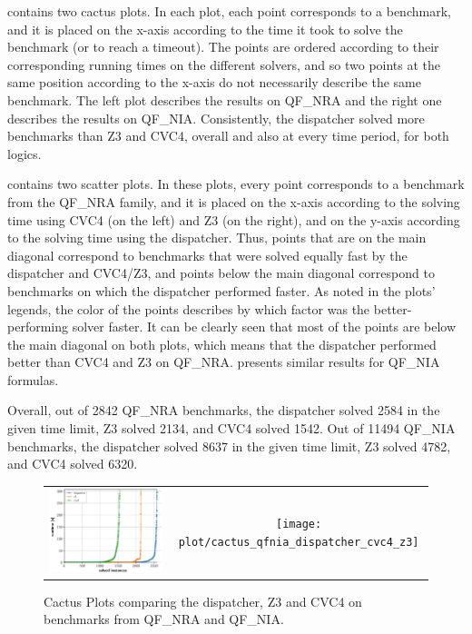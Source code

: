 \documentclass{article}
\begin{document}
 contains two cactus plots.
In each plot, each point corresponds to a benchmark, and it
is placed on the x-axis according to the time
it took to solve the benchmark (or to reach a timeout).
The points are ordered according to their corresponding
running times on the different solvers, and so
two points at the same position according to the x-axis
do not necessarily describe the same benchmark.
The left plot describes the results on QF\_NRA and
the right one describes the results on QF\_NIA.
Consistently, the dispatcher solved more benchmarks
than Z3 and CVC4, overall and also at every time period,
for both logics.

 contains two scatter plots.
In these plots, every point corresponds to a benchmark
from the QF\_NRA family,
and it is placed on the x-axis according to the
solving time using CVC4 (on the left) and Z3 (on the right),
and on the y-axis according to the solving time using
the dispatcher.
%
Thus, points that are on the main diagonal correspond to benchmarks that
were solved equally fast by the dispatcher and CVC4/Z3,
and points below the main diagonal correspond
to benchmarks on which the dispatcher performed
faster.
%
As noted in the plots' legends, the color of the points
describes by which factor was the better-performing solver faster.
%
It can be clearly seen that most of the points are below the main diagonal on both plots,
which means that the dispatcher performed better
than CVC4 and Z3 on QF\_NRA.
%
 presents similar results for QF\_NIA formulas.

Overall, out of 2842 QF\_NRA benchmarks,
the dispatcher solved 2584 in the given time limit,
Z3 solved 2134, and
CVC4 solved 1542.
%
Out of 11494 QF\_NIA benchmarks,
the dispatcher solved 8637 in the given time limit,
Z3 solved 4782, and
CVC4 solved 6320.


\begin{figure}
\begin{center}
\begin{tabular}{cc}
\includegraphics[width=.5\textwidth]{plot/cactus_qfnra_dispatcher_cvc4_z3}
&
\texttt{[image: plot/cactus\_qfnia\_dispatcher\_cvc4\_z3]}  
\end{tabular}
\end{center}
\caption{\label{cactus}Cactus Plots comparing the dispatcher, Z3 and CVC4 on benchmarks from QF\_NRA and QF\_NIA.}
\end{figure}
\end{document}
